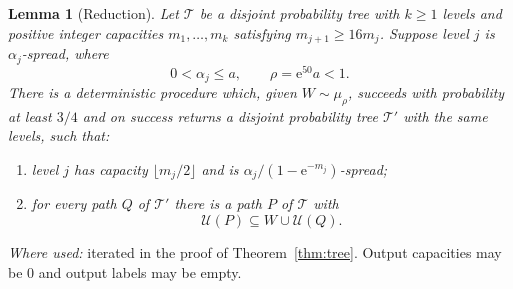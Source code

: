 \documentclass[11pt]{article}
\newtheorem{lemma}[theorem]{Lemma}
\numberwithin{equation}{section}
\newcommand{\TT}{\mathcal T}
\newcommand{\UU}{\mathcal U}
\newcommand{\ee}{\mathrm e}
\begin{document}
\begin{lemma}[Reduction]\label{lem:reduction}
Let $\TT$ be a disjoint probability tree with $k\ge1$ levels and positive integer
capacities $m_1,\ldots,m_k$ satisfying $m_{j+1}\ge16m_j$.
Suppose level $j$ is $\alpha_j$-spread, where
\[
 0<\alpha_j\le a,\qquad \rho=\ee^{50}a<1.
\]
There is a deterministic procedure which, given $W\sim\mu_\rho$,
succeeds with probability at least $3/4$ and on success returns a
disjoint probability tree $\TT'$ with the same levels, such that:
\begin{enumerate}[label=(\roman*),leftmargin=2.2em,itemsep=2pt]
 \item level $j$ has capacity $\lfloor m_j/2\rfloor$ and is
 $\alpha_j/(1-\ee^{-m_j})$-spread;
 \item for every path $Q$ of $\TT'$ there is a path $P$ of $\TT$ with
 \begin{equation}\label{eq:recovery}
   \UU(P)\subseteq W\cup\UU(Q).
 \end{equation}
\end{enumerate}
\end{lemma}

\emph{Where used:} iterated in the proof of Theorem~\ref{thm:tree}. Output
capacities may be $0$ and output labels may be empty.
\end{document}
